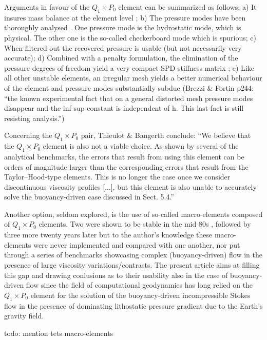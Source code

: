 \documentclass[a4paper,12pt]{article}
\begin{document}
Arguments in favour of the $Q_1\times P_0$ element can be summarized as follows:
a) It insures mass balance at the element level \cite[p459]{grsa};
b) The pressure modes have been thoroughly analysed \cite{sagl81a,sagl81b,grsi94}.
One pressure mode is the hydrostatic mode, which is  
physical. The other one is the so-called checkerboard mode which is spurious;
c) When filtered out \cite{chpc95} the recovered pressure is usable (but not 
necessarily very accurate);
d) Combined with a penalty formulation, the elimination of the pressure degrees of freedom 
yield a very compact SPD stiffness matrix \cite{zigo75,hulb79,zina82,redd82,odks82};
e) Like all other unstable elements, an irregular mesh yields a 
better numerical behaviour of the element \cite{qizh07} and pressure modes substantially subdue
(Brezzi \& Fortin p244: ``the known experimental fact that on a general
distorted mesh pressure modes disappear and the inf-sup constant is independent of h. 
This last fact is still resisting analysis.'')

Concerning the $Q_1 \times P_0$ pair, Thieulot \& Bangerth \cite{thba22} conclude:
``We believe that the $Q_1 \times P_0$ element is also not a viable
choice. As shown by several of the analytical benchmarks, the errors that result from using this element can
be orders of magnitude larger than the corresponding
errors that result from the Taylor–Hood-type elements.
This is no longer the case once we consider discontinuous viscosity profiles [...], but this element
is also unable to accurately solve the buoyancy-driven
case discussed in Sect. 5.4.''

Another option, seldom explored, is the use of so-called macro-elements composed of $Q_1\times P_0$ elements. 
Two were shown to be stable in the mid 80s \cite{leta81,sten84}, followed by three more twenty years
later\cite{qizh07} but to the author's knowledge these macro-elements were never 
implemented and compared with one another, nor put through a series of benchmarks showcasing 
complex (buoyancy-driven) flow in the 
presence of large viscosity variations/contrasts. The present article aims at 
filling this gap and drawing conlusions as to their usability also in the case of buoyancy-driven flow
since the field of computational geodynamics has long relied on the $Q_1\times P_0$ element for the 
solution of the buoyancy-driven incompressible Stokes flow in the presence of 
dominating lithostatic pressure gradient due to the Earth's gravity field.  

{\color{red} todo: mention tets macro-elements}
\end{document}

